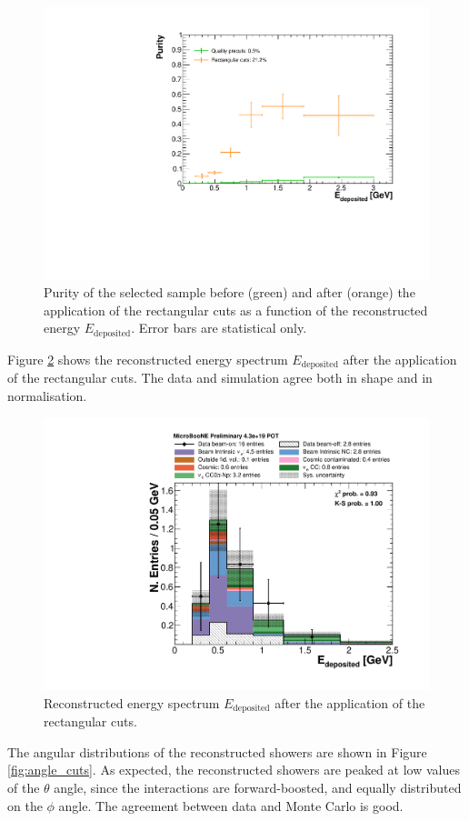 \begin{figure}[htbp]
\centering
  \includegraphics[width=0.75\linewidth]{figures/purity_sel.pdf}
  \caption{Purity of the selected sample before (green) and after (orange) the application of the rectangular cuts as a function of the reconstructed energy $E_{\mathrm{deposited}}$. Error bars are statistical only.}\label{fig:purity_sel}
\end{figure}


Figure \ref{fig:reco_cuts} shows the reconstructed energy spectrum $E_{\mathrm{deposited}}$ after the application of the rectangular cuts. The data and simulation agree both in shape and in normalisation.

\begin{figure}[htbp]
\centering
  \includegraphics[width=0.75\linewidth]{figures/h_reco_energy_cuts.pdf}
  \caption{Reconstructed energy spectrum $E_{\mathrm{deposited}}$ after the application of the rectangular cuts.}\label{fig:reco_cuts}
\end{figure}

The angular distributions of the reconstructed showers are shown in Figure \ref{fig:angle_cuts}. As expected, the reconstructed showers are peaked at low values of the $\theta$ angle, since the interactions are forward-boosted, and equally distributed on the $\phi$ angle. The agreement between data and Monte Carlo is good.

